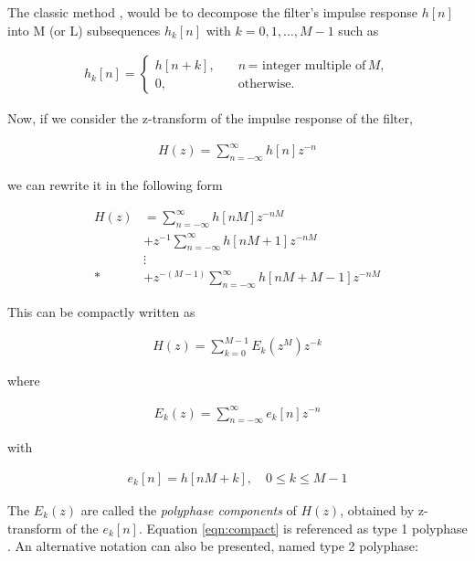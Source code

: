 The classic method \cite{Oppenheim}, \cite{oppenheim2} would be to decompose the filter's impulse response $h[n]$ into M (or L) subsequences $h_k[n]$ with $ k = 0, 1, \dots, M-1$ such as


\begin{align}
h_k[n] = 
	\begin{cases}
	h[n + k], & \quad n \,\text{= integer multiple of} \,M, \\ 
	0, & \quad \text{otherwise}. \label{eqn:subsequences}
	\end{cases}
\end{align}

Now, if we consider the z-transform of the impulse response of the filter,

\begin{align}
	H(z) = \sum\limits_{n=-\infty}^{\infty} h[n]z^{-n} \label{eqn:ztrans}
\end{align}

we can rewrite it in the following form

	\begin{align} \label{eqn:ztranspoly}
		H(z) &= \sum\limits_{n=-\infty}^{\infty} h[nM]z^{-nM} \nonumber\\ 
		&+ z^{-1} \sum\limits_{n=-\infty}^{\infty} h[nM+1]z^{-nM} \\ 
		&\vdots \nonumber \\*
		&+ z^{-(M-1)} \sum\limits_{n=-\infty}^{\infty} h[nM+M-1]z^{-nM} \nonumber 
	\end{align}

This can be compactly written as 

\begin{align}
H(z) = \sum\limits_{k=0}^{M-1} E_k(z^M)z^{-k} \label{eqn:compact}
\end{align}

where

\begin{align}
E_k(z) = \sum\limits_{n=-\infty}^{\infty} e_k[n]z^{-n} \label{eqn:zpolycomp}
\end{align}

with

\begin{align}
e_k[n] = h[nM + k], \quad 0 \leq k \leq M-1 \label{eqn:polycomp}
\end{align}

The $E_k(z)$ are called the \textit{polyphase components} of $H(z)$, obtained by z-transform \cite{Oppenheim} of the $e_k[n]$. Equation \ref{eqn:compact} is referenced as type 1 polyphase \cite{vaidyanathan}. An alternative notation can also be presented, named type 2 polyphase:


